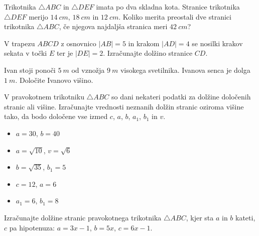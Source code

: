             \begin{naloga}
                Trikotnika $\triangle ABC$ in $\triangle DEF$ imata po dva skladna kota. 
                Stranice trikotnika $\triangle DEF$ merijo $14~cm$, $18~cm$ in $12~cm$.
                Koliko merita preostali dve stranici trikotnika $\triangle ABC$, 
                če njegova najdaljša stranica meri $42~cm$?
            \end{naloga}

            \begin{naloga}
                V trapezu $ABCD$ z osnovnico $|AB|=5$ in krakom $|AD|=4$ se nosilki krakov sekata v točki $E$ ter je $|DE|=2$.
                Izračunajte dolžino stranice $CD$.
            \end{naloga}

            \begin{naloga}
                Ivan stoji ponoči $5~m$ od vznožja $9~m$ visokega svetilnika. 
                Ivanova senca je dolga $1~m$.
                Določite Ivanovo višino.
            \end{naloga}



            \begin{naloga}
                V pravokotnem trikotniku $\triangle ABC$ so dani nekateri podatki za dolžine določenih stranic ali višine.
                Izračunajte vrednosti neznanih dolžin stranic oziroma višine tako, da bodo določene vse izmed $c$, $a$, $b$, $a_1$, $b_1$ in $v$.
                \begin{itemize}
                    \item $a=30$, $b=40$
                    \item $a=\sqrt{10}$, $v=\sqrt{6}$
                    \item $b=\sqrt{35}$, $b_1=5$
                    \item $c=12$, $a=6$
                    \item $a_1=6$, $b_1=8$
                \end{itemize}
            \end{naloga}

            \begin{naloga}
                Izračunajte dolžine stranic pravokotnega trikotnika $\triangle ABC$, kjer sta $a$ in $b$ kateti, $c$ pa hipotenuza:
                $a=3x-1$, $b=5x$, $c=6x-1$.
            \end{naloga}

       

